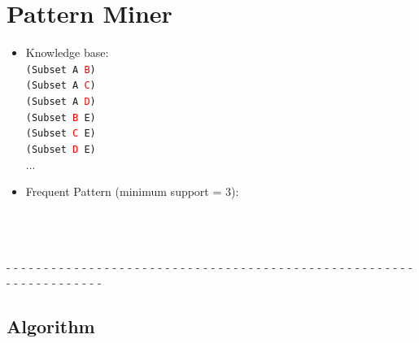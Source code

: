 \documentclass[aspectratio=169]{beamer}
\begin{document}
\section{Pattern Miner}

\begin{frame}

  {\small
    \begin{itemize}
    \item Knowledge base:\\
      \texttt{(Subset A \textcolor<2,4>{red}{B})}\\
      \texttt{(Subset A \textcolor<2,4>{red}{C})}\\
      \texttt{(Subset A \textcolor<2,4>{red}{D})}\\
      \texttt{(Subset \textcolor<3->{red}{B} E)}\\
      \texttt{(Subset \textcolor<3->{red}{C} E)}\\
      \texttt{(Subset \textcolor<3->{red}{D} E)}\\
      ...\\

    \item Frequent Pattern (minimum support = 3):\\
      \\
      \\
      \\
    \end{itemize}
  }

  - - - - - - - - - - - - - - - - - - - - - - - - - - - - - - - - - -
  - - - - - - - - - - - - - - - - - - - - - - - - - - - - - - - - -\\[0.1cm]

\end{frame}

\subsection{Algorithm}
\end{document}
